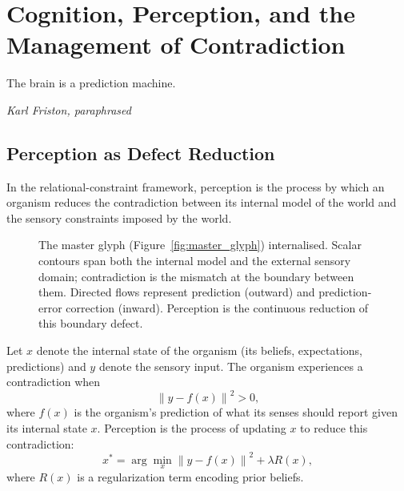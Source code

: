 \documentclass[12pt,a4paper,openany]{book}
\theoremstyle{plain}
\theoremstyle{definition}
\theoremstyle{remark}
\newcommand{\norm}[1]{\left\|#1\right\|}
\newcommand{\RSVPContours}[2]{%
  \foreach \r in {0.45,0.90,1.35,1.80}{%
    \draw[rsvp scalar] (#1,#2) circle (\r);}}
\begin{document}
\chapter{Cognition, Perception, and the Management of Contradiction}

\epigraph{%
  The brain is a prediction machine.
}{%
  \textit{Karl Friston, paraphrased}}

\section{Perception as Defect Reduction}

In the relational-constraint framework, perception is the process by which an organism reduces the contradiction between its internal model of the world and the sensory constraints imposed by the world.

\begin{figure}[h]
\centering
{}
\caption[Cognition glyph, Chapter~15: perception]{The master glyph (Figure~\ref{fig:master_glyph}) internalised. Scalar contours span both the internal model and the external sensory domain; contradiction is the mismatch at the boundary between them. Directed flows represent prediction (outward) and prediction-error correction (inward). Perception is the continuous reduction of this boundary defect.}
\label{fig:glyph_cognition}
\end{figure}

Let $x$ denote the internal state of the organism (its beliefs, expectations, predictions) and $y$ denote the sensory input. The organism experiences a contradiction when
\[
\norm{y - f(x)}^2 > 0,
\]
where $f(x)$ is the organism's prediction of what its senses should report given its internal state $x$. Perception is the process of updating $x$ to reduce this contradiction:
\[
x^* = \arg\min_x \norm{y - f(x)}^2 + \lambda R(x),
\]
where $R(x)$ is a regularization term encoding prior beliefs.
\end{document}
